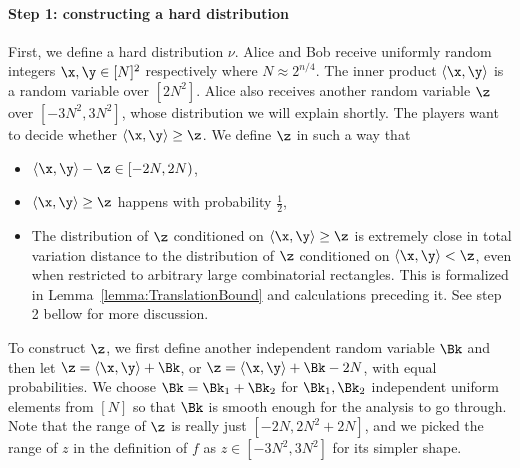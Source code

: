\paragraph{Step 1: constructing a hard distribution}
First, we define a hard distribution $\nu$. Alice and Bob receive uniformly random integers $\x,\y\in [N]^2$ respectively where $N \approx 2^{n/4}$. The inner product $\langle \x,\y\rangle$ is a random variable over $[2N^2]$. Alice also receives another random variable $\z$ over $[-3N^2,3N^2]$, whose distribution we will explain shortly. The players want to decide whether $\langle \x,\y\rangle \ge \z$. We define $\z$ in such a way that
\begin{itemize}
	\item  $\langle \x,\y\rangle -\z  \in [-2N,2N)$,

	\item $\langle \x,\y\rangle \ge \z$  happens with probability $\frac{1}{2}$,
	\item The distribution of $ \z $ conditioned on $\langle \x,\y\rangle \ge \z$ is extremely close in total variation distance to the distribution of $\z$ conditioned on $\langle \x,\y\rangle < \z$, even when restricted to arbitrary large combinatorial rectangles. This is formalized in Lemma~\ref{lemma:TranslationBound} and calculations preceding it. See step 2 bellow for more discussion. 
\end{itemize}
To construct $\z$, we first define another independent random variable $\Bk$ and then let $\z = \langle \x,\y\rangle + \Bk$, or $\z =\langle \x,\y\rangle + \Bk-2N$, with equal probabilities. We choose $\Bk = \Bk_1+\Bk_2 $ for $\Bk_1,\Bk_2$ independent uniform elements from $[N]$ so that $\Bk$ is smooth enough
for the analysis to go through.
Note that the range of $\z$ is really just $[-2N,2N^2+2N]$, and we picked the range of $z$ in the definition of $f$ as $z\in [-3N^2,3N^2]$ for its simpler shape.
